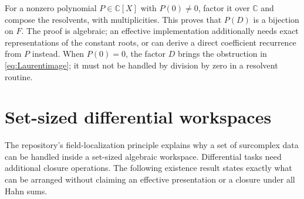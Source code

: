 \documentclass[11pt]{article}
\numberwithin{equation}{section}
\theoremstyle{definition}
\newcommand{\C}{\mathbb C}
\begin{document}
For a nonzero polynomial $P\in\C[X]$ with $P(0)\ne0$, factor it
over $\C$ and compose the resolvents, with multiplicities. This proves
that $P(D)$ is a bijection on $F$. The proof is algebraic; an effective
implementation additionally needs exact representations of the constant
roots, or can derive a direct coefficient recurrence from $P$ instead.
When $P(0)=0$, the factor $D$ brings the obstruction in
\eqref{eq:Laurentimage}; it must not be handled by division by zero in a
resolvent routine.

\section{Set-sized differential workspaces}
\label{sec:workspaces}

The repository's field-localization principle explains why a set of
surcomplex data can be handled inside a set-sized algebraic workspace.
Differential tasks need additional closure operations. The following
existence result states exactly what can be arranged without claiming an
effective presentation or a closure under all Hahn sums.
\end{document}
